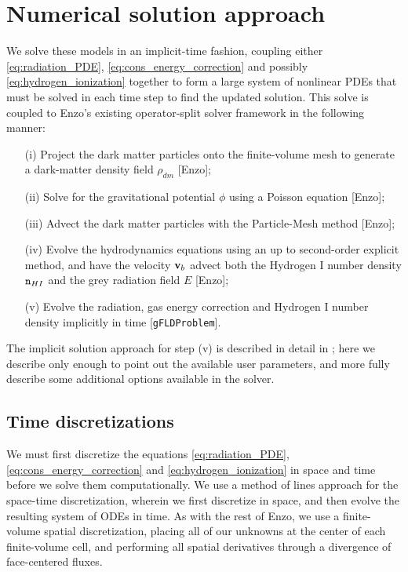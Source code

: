 \documentclass[letterpaper,10pt]{article}
\renewcommand{\(}{\left(}
\renewcommand{\)}{\right)}
\newcommand{\vb}{{\bf v}_b}
\newcommand{\mn}{{\tt n}}
\begin{document}
\section{Numerical solution approach}
\label{sec:solution_approach}

We solve these models in an implicit-time fashion, coupling either 
\eqref{eq:radiation_PDE}, \eqref{eq:cons_energy_correction} and
possibly \eqref{eq:hydrogen_ionization} together to form a large
system of nonlinear PDEs that must be solved in each time step to find
the updated solution.  This solve is coupled to Enzo's existing
operator-split solver framework in the following manner:
\begin{itemize}
\item[(i)] Project the dark matter particles onto the finite-volume
  mesh to generate a dark-matter density field $\rho_{dm}$ [Enzo];
\item[(ii)] Solve for the gravitational potential $\phi$ using a
  Poisson equation [Enzo];
\item[(iii)] Advect the dark matter particles with the Particle-Mesh
  method [Enzo];
\item[(iv)] Evolve the hydrodynamics equations using an up to
  second-order explicit method, and have the velocity $\vb$ advect
  both the Hydrogen I number density $\mn_{HI}$ and the grey radiation
  field $E$ [Enzo]; 
\item[(v)] Evolve the radiation, gas energy correction and Hydrogen I
  number density implicitly in time [{\tt gFLDProblem}].
\end{itemize}

The implicit solution approach for step (v) is described in detail in 
\cite{ReynoldsHayesPaschosNorman2009}; here we describe only enough
to point out the available user parameters, and more fully describe
some additional options available in the solver.

\subsection{Time discretizations}
\label{sec:iqss}

We must first discretize the equations \eqref{eq:radiation_PDE},
\eqref{eq:cons_energy_correction} and \eqref{eq:hydrogen_ionization}
in space and time before we solve them computationally.  We use a
method of lines approach for the space-time discretization, wherein we
first discretize in space, and then evolve the resulting system of
ODEs in time.  As with the rest of Enzo, we use a finite-volume
spatial discretization, placing all of our unknowns at the center of
each finite-volume cell, and performing all spatial derivatives
through a divergence of face-centered fluxes.  
\end{document}
